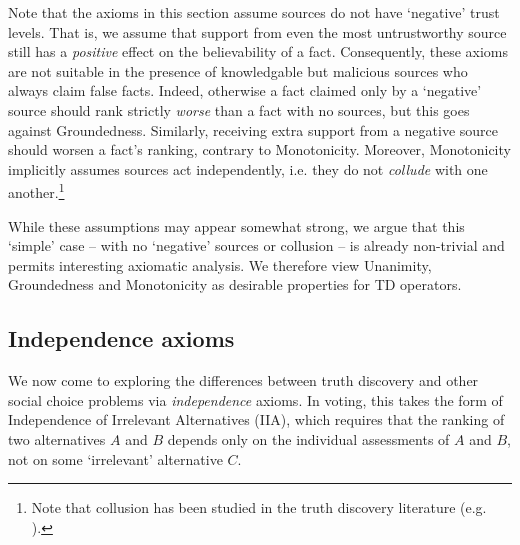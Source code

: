 Note that the axioms in this section assume sources do not have `negative'
trust levels. That is, we assume that support from even the most untrustworthy
source still has a \emph{positive} effect on the believability of a fact.
Consequently, these axioms are not suitable in the presence of knowledgable but
malicious sources who always claim false facts. Indeed, otherwise a fact
claimed only by a `negative' source should rank strictly \emph{worse} than a
fact with no sources, but this goes against Groundedness. Similarly, receiving
extra support from a negative source should worsen a fact's ranking, contrary
to Monotonicity. Moreover, Monotonicity implicitly assumes sources act
independently, i.e. they do not \emph{collude} with one another.\footnote{Note
that collusion has been studied in the truth discovery literature (e.g.
\cite{dong2009integrating,balakrishnan2011sourcerank,dong_truth_2009}).}

While these assumptions may appear somewhat strong, we argue that this `simple'
case -- with no `negative' sources or collusion -- is already non-trivial and
permits interesting axiomatic analysis.
%
We therefore view Unanimity, Groundedness and Monotonicity as desirable
properties for TD operators.

\subsection{Independence axioms}
\label{td_sec_indep_axioms}


We now come to exploring the differences between truth discovery and other
social choice problems via \emph{independence} axioms. In voting,
this takes the form of Independence of Irrelevant Alternatives (IIA), which
requires that the ranking of two alternatives $A$ and $B$ depends only on the
individual assessments of $A$ and $B$, not on some `irrelevant' alternative
$C$.

